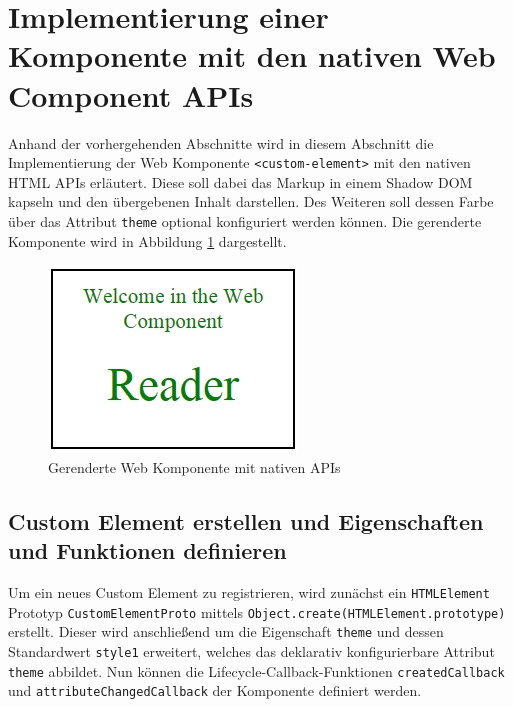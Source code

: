 \section{Implementierung einer Komponente mit den nativen Web Component APIs}\label{implementierung-einer-komponente-mit-den-nativen-web-component-apis}

Anhand der vorhergehenden Abschnitte wird in diesem Abschnitt die Implementierung der Web Komponente \texttt{\textless{}custom-element\textgreater{}} mit den nativen HTML APIs erläutert. Diese soll dabei das Markup in einem Shadow DOM kapseln und den übergebenen Inhalt darstellen. Des Weiteren soll dessen Farbe über das Attribut \texttt{theme} optional konfiguriert werden können. Die gerenderte Komponente wird in Abbildung \ref{fig:gwkmnapis} dargestellt.

\begin{figure}[htbp]
 \centering
 \includegraphics{kapitel2/bilder/7-beispiel}
 \caption{Gerenderte Web Komponente mit nativen APIs}
 \label{fig:gwkmnapis}
\end{figure}


\subsection{Custom Element erstellen und Eigenschaften und Funktionen definieren}\label{custom-element-erstellen-und-eigenschaften-und-funktionen-definieren}

Um ein neues Custom Element zu registrieren, wird zunächst ein \texttt{HTMLElement} Prototyp \texttt{CustomElementProto} mittels \texttt{Object.create(HTMLElement.prototype)} erstellt. Dieser wird anschließend um die Eigenschaft \texttt{theme} und dessen Standardwert \texttt{style1} erweitert, welches das deklarativ konfigurierbare
Attribut \texttt{theme} abbildet. Nun können die Lifecycle-Callback-Funktionen \texttt{createdCallback} und \texttt{attributeChangedCallback} der Komponente definiert werden.

